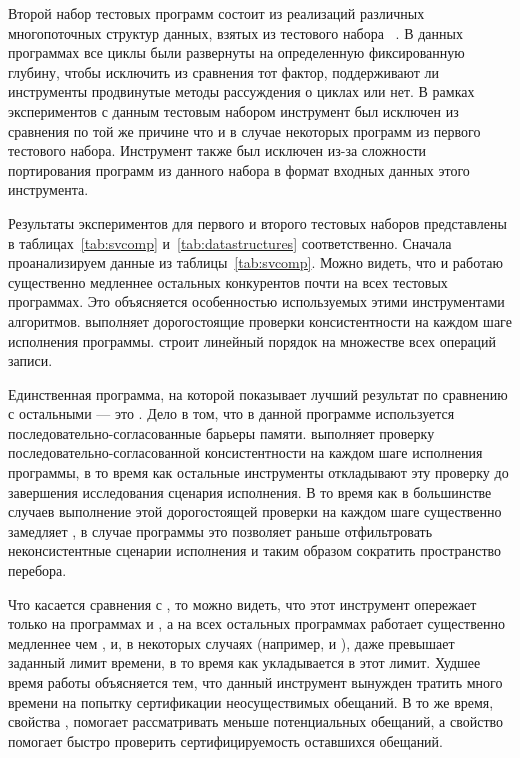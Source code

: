 Второй набор тестовых программ состоит из 
реализаций различных многопоточных структур данных, 
взятых из тестового набора \CDSChecker~\cite{Norris-Demsky:OOPSLA2013}. 
В данных программах все циклы были развернуты 
на определенную фиксированную глубину, чтобы исключить из сравнения тот фактор, 
поддерживают ли инструменты продвинутые методы рассуждения о циклах или нет. 
В рамках экспериментов с данным тестовым набором инструмент \Nidhugg 
был исключен из сравнения по той же причине что 
и в случае некоторых программ из первого тестового набора. 
Инструмент \rmem также был исключен из-за сложности портирования 
программ из данного набора в формат входных данных этого инструмента.



Результаты экспериментов для первого и второго 
тестовых наборов представлены в таблицах~\ref{tab:svcomp} 
и~\ref{tab:datastructures} соответственно.
Сначала проанализируем данные из таблицы~\ref{tab:svcomp}. 
Можно видеть, что \Nidhugg и \rmem работаю существенно медленнее остальных 
конкурентов почти на всех тестовых программах. 
Это объясняется особенностью используемых этими инструментами алгоритмов.
\Nidhugg выполняет дорогостоящие проверки консистентности
на каждом шаге исполнения программы.
\rmem строит линейный порядок на множестве всех операций записи.

Единственная программа, на которой \Nidhugg показывает 
лучший результат по сравнению с остальными --- это .
Дело в том, что в данной программе используется 
последовательно-согласованные барьеры памяти.
\Nidhugg выполняет проверку последовательно-согласованной
консистентности на каждом шаге исполнения программы, в то время 
как остальные инструменты откладывают эту проверку 
до завершения исследования сценария исполнения. 
В то время как в большинстве случаев выполнение этой дорогостоящей проверки 
на каждом шаге существенно замедляет \Nidhugg, 
в случае программы  это позволяет 
раньше отфильтровать неконсистентные сценарии исполнения 
и таким образом сократить пространство перебора. 

Что касается сравнения с \CDSChecker, то можно видеть,
что этот инструмент опережает \wmc только 
на программах  и , 
а на всех остальных программах \CDSChecker работает существенно 
медленнее чем \wmc, и, в некоторых случаях 
(например,  и ), 
даже превышает заданный лимит времени, в то время как 
\wmc укладывается в этот лимит.
Худшее время работы \CDSChecker объясняется тем, что 
данный инструмент вынужден тратить много времени 
на попытку сертификации неосуществимых обещаний. 
В то же время, свойства \LBRF, помогает \wmc 
рассматривать меньше потенциальных обещаний, 
а свойство \CL помогает быстро проверить 
сертифицируемость оставшихся обещаний.  

